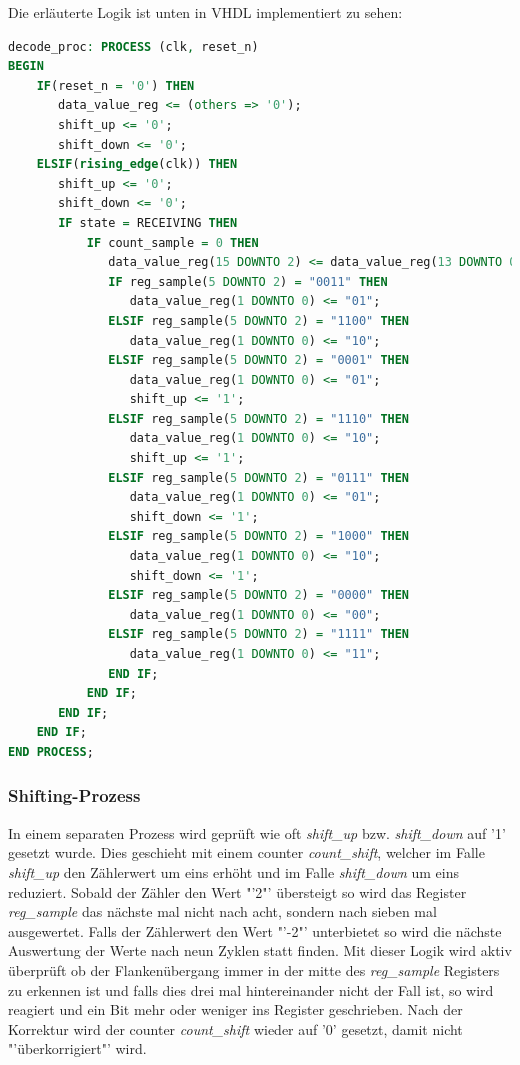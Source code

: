 Die erläuterte Logik ist unten in VHDL implementiert zu sehen:

\begin{lstlisting}[language=vhdl]
decode_proc: PROCESS (clk, reset_n)
BEGIN		
    IF(reset_n = '0') THEN
       data_value_reg <= (others => '0');
       shift_up <= '0';
       shift_down <= '0';	
    ELSIF(rising_edge(clk)) THEN
       shift_up <= '0';
       shift_down <= '0';
       IF state = RECEIVING THEN
    	   IF count_sample = 0 THEN
    	      data_value_reg(15 DOWNTO 2) <= data_value_reg(13 DOWNTO 0);
    	      IF reg_sample(5 DOWNTO 2) = "0011" THEN
    	         data_value_reg(1 DOWNTO 0) <= "01";
    	      ELSIF reg_sample(5 DOWNTO 2) = "1100" THEN
    	         data_value_reg(1 DOWNTO 0) <= "10";
    	      ELSIF reg_sample(5 DOWNTO 2) = "0001" THEN
    	         data_value_reg(1 DOWNTO 0) <= "01";
    	         shift_up <= '1';
    	      ELSIF reg_sample(5 DOWNTO 2) = "1110" THEN
    	         data_value_reg(1 DOWNTO 0) <= "10";
    	         shift_up <= '1';
    	      ELSIF reg_sample(5 DOWNTO 2) = "0111" THEN
    	         data_value_reg(1 DOWNTO 0) <= "01";
    	         shift_down <= '1';
    	      ELSIF reg_sample(5 DOWNTO 2) = "1000" THEN
    	         data_value_reg(1 DOWNTO 0) <= "10";
    	         shift_down <= '1';
    	      ELSIF reg_sample(5 DOWNTO 2) = "0000" THEN
    	         data_value_reg(1 DOWNTO 0) <= "00";
    	      ELSIF reg_sample(5 DOWNTO 2) = "1111" THEN
    	         data_value_reg(1 DOWNTO 0) <= "11";
              END IF;
    	   END IF;
       END IF;		
    END IF;
END PROCESS;
\end{lstlisting}

\subsubsection{Shifting-Prozess}
\label{Shifting-Prozess}
In einem separaten Prozess wird geprüft wie oft \textit{shift\_up} bzw. \textit{shift\_down} auf '1' gesetzt wurde. Dies geschieht mit einem counter \textit{count\_shift}, welcher im Falle \textit{shift\_up} den Zählerwert um eins erhöht und im Falle \textit{shift\_down} um eins reduziert. Sobald der Zähler den Wert "'2"' übersteigt so wird das Register \textit{reg\_sample} das nächste mal nicht nach acht, sondern nach sieben mal ausgewertet. Falls der Zählerwert den Wert "'-2"' unterbietet so wird die nächste Auswertung der Werte nach neun Zyklen statt finden. Mit dieser Logik wird aktiv überprüft ob der Flankenübergang immer in der mitte des \textit{reg\_sample} Registers zu erkennen ist und falls dies drei mal hintereinander nicht der Fall ist, so wird reagiert und ein Bit mehr oder weniger ins Register geschrieben.
Nach der Korrektur wird der counter \textit{count\_shift} wieder auf '0' gesetzt, damit nicht "'überkorrigiert"' wird.

